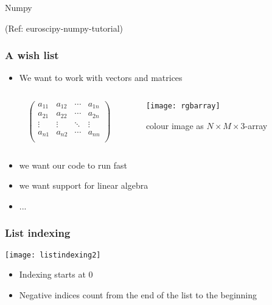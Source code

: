 \begin{frame}[fragile]\frametitle{}
\begin{center}
{\Large Numpy}

(Ref: euroscipy-numpy-tutorial)
\end{center}
\end{frame}

\begin{frame}[fragile]\frametitle{A wish list}	
\begin{itemize}
  \item We want to work with vectors and matrices
 \end{itemize}

 \begin{columns}
  \begin{column}{0.55\linewidth}
   \begin{displaymath}
    \begin{pmatrix}
     a_{11} & a_{12} & \cdots & a_{1n}\\
     a_{21} & a_{22} & \cdots & a_{2n}\\
     \vdots & \vdots & \ddots & \vdots\\
     a_{n1} & a_{n2} & \cdots & a_{nn}\\
    \end{pmatrix}
   \end{displaymath}
  \end{column}%
  \begin{column}{0.45\linewidth}
   \texttt{[image: rgbarray]}

   colour image as $N\times M\times3$-array
  \end{column}
 \end{columns}

 \begin{itemize}
  \item we want our code to run fast
  \item we want support for linear algebra
  \item ... 
 \end{itemize}
\end{frame}

\begin{frame}[fragile]\frametitle{List indexing}
 \begin{center}
  \texttt{[image: listindexing2]}
 \end{center}
 \begin{itemize}
  \item Indexing starts at 0
  \item Negative indices count from the end of the list to the beginning
 \end{itemize}
\end{frame}

